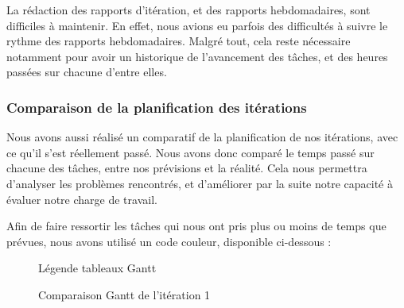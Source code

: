 \documentclass[12pt,titlepage,french]{article}
\begin{document}
La rédaction des rapports d'itération, et des rapports hebdomadaires, sont difficiles à maintenir. En effet, nous avions eu parfois des difficultés à suivre le rythme des rapports hebdomadaires. Malgré tout, cela reste nécessaire notamment pour avoir un historique de l'avancement des tâches, et des heures passées sur chacune d'entre elles.

\subsubsection{Comparaison de la planification des itérations}

Nous avons aussi réalisé un comparatif de la planification de nos itérations, avec ce qu'il s'est réellement passé. Nous avons donc comparé le temps passé sur chacune des tâches, entre nos prévisions et la réalité. Cela nous permettra d'analyser les problèmes rencontrés, et d'améliorer par la suite notre capacité à évaluer notre charge de travail. \newline

Afin de faire ressortir les tâches qui nous ont pris plus ou moins de temps que prévues, nous avons utilisé un code couleur, disponible ci-dessous :

\begin{figure}[H]
    \caption{\label{} Légende tableaux Gantt}
\end{figure}


\begin{figure}[H]
    \caption{\label{} Comparaison Gantt de l'itération 1}
\end{figure}
\end{document}
